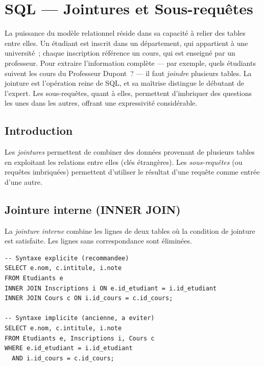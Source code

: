 \chapter{SQL --- Jointures et Sous-requ\^etes}
\label{ch:jointures}

La puissance du mod\`ele relationnel r\'eside dans sa capacit\'e \`a relier des tables entre elles. Un \'etudiant est inscrit dans un d\'epartement, qui appartient \`a une universit\'e~; chaque inscription r\'ef\'erence un cours, qui est enseign\'e par un professeur. Pour extraire l'information compl\`ete --- par exemple, \og quels \'etudiants suivent les cours du Professeur Dupont~? \fg --- il faut \emph{joindre} plusieurs tables. La jointure est l'op\'eration reine de SQL, et sa ma\^itrise distingue le d\'ebutant de l'expert. Les sous-requ\^etes, quant \`a elles, permettent d'imbriquer des questions les unes dans les autres, offrant une expressivit\'e consid\'erable.

\section{Introduction}

Les \emph{jointures} permettent de combiner des donn\'ees provenant de plusieurs
tables en exploitant les relations entre elles (cl\'es \'etrang\`eres).
Les \emph{sous-requ\^etes} (ou requ\^etes imbriqu\'ees) permettent d'utiliser
le r\'esultat d'une requ\^ete comme entr\'ee d'une autre.

\section{Jointure interne (INNER JOIN)}

\begin{definition}
La \emph{jointure interne} combine les lignes de deux tables o\`u la condition
de jointure est satisfaite. Les lignes sans correspondance sont \'elimin\'ees.
\end{definition}

\begin{codeblock}[title=\textbf{Syntaxes \'equivalentes de la jointure interne}]
\begin{verbatim}
-- Syntaxe explicite (recommandee)
SELECT e.nom, c.intitule, i.note
FROM Etudiants e
INNER JOIN Inscriptions i ON e.id_etudiant = i.id_etudiant
INNER JOIN Cours c ON i.id_cours = c.id_cours;

-- Syntaxe implicite (ancienne, a eviter)
SELECT e.nom, c.intitule, i.note
FROM Etudiants e, Inscriptions i, Cours c
WHERE e.id_etudiant = i.id_etudiant
  AND i.id_cours = c.id_cours;
\end{verbatim}
\end{codeblock}

